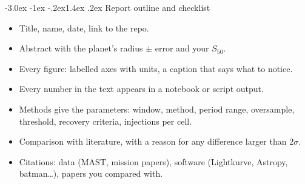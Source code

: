 \documentclass[11pt,a4paper]{article}
\makeatletter
\renewcommand\section{\@startsection{section}{1}{\z@}%
  {-3.0ex \@plus -1ex \@minus -.2ex}{1.4ex \@plus .2ex}%
  {\normalfont\sffamily\LARGE\bfseries\color{navy}}}
\renewcommand{\labelitemi}{{\color{amber}\small$\blacktriangleright$}}
\newenvironment{checklist}{\begin{itemize}\renewcommand{\labelitemi}{\color{teal}\ding{113}}}{\end{itemize}}
\makeatother
\begin{document}
\section{Report outline and checklist}
\label{app:report}
\begin{checklist}
  \item Title, name, date, link to the repo.
  \item Abstract with the planet's radius \(\pm\) error and your \(S_{50}\).
  \item Every figure: labelled axes with units, a caption that says what to notice.
  \item Every number in the text appears in a notebook or script output.
  \item Methods give the parameters: window, method, period range, oversample, threshold, recovery criteria, injections per cell.
  \item Comparison with literature, with a reason for any difference larger than 2\(\sigma\).
  \item Citations: data (MAST, mission papers), software (Lightkurve, Astropy, batman\ldots), papers you compared with.
\end{checklist}



\end{document}

